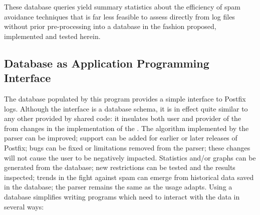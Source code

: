 \documentclass[a4paper,12pt,draft]{article}
\begin{document}
These database queries yield summary statistics about the efficiency of
spam avoidance techniques that is far less feasible to assess directly from
log files without prior pre-processing into a database in the fashion
proposed, implemented and tested herein.

\subsection{Database as Application Programming Interface}

\label{database as API}

The database populated by this program provides a simple interface to
Postfix logs.  Although the interface is a database schema, it is in effect
quite similar to any other \API{} provided by shared code: it insulates
both user and provider of the \API{} from changes in the implementation of
the \API{}\@.  The algorithm implemented by the parser can be improved;
support can be added for earlier or later releases of Postfix; bugs can be
fixed or limitations removed from the parser; these changes will not cause
the user to be negatively impacted.  Statistics and/or graphs can be
generated from the database; new restrictions can be tested and the results
inspected; trends in the fight against spam can emerge from historical data
saved in the database; the parser remains the same as the usage adapts.
Using a database simplifies writing programs which need to interact with
the data in several ways:
\end{document}
